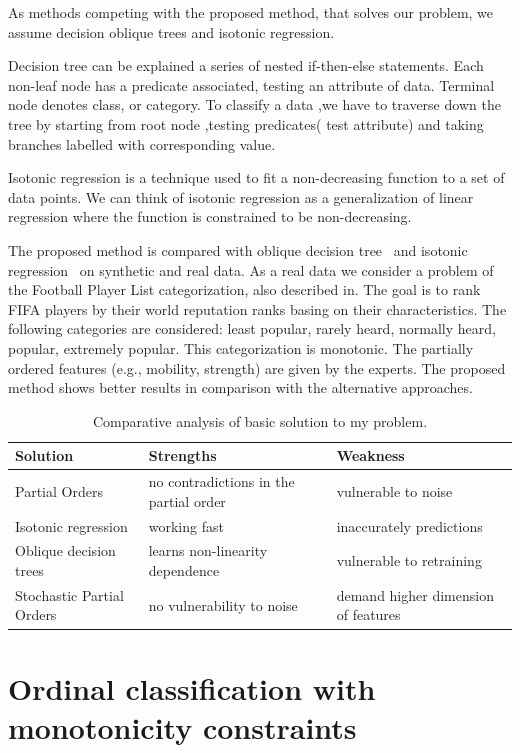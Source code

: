 \documentclass[12pt,preprint]{elsarticle}
\begin{document}
As methods competing with the proposed method, that solves our problem, we assume decision oblique trees and isotonic regression.

Decision tree can be explained a series of nested if-then-else statements. Each  non-leaf  node  has  a  predicate  associated, testing an  attribute of data.  Terminal node  denotes class, or category. To classify a data ,we have to traverse down the tree by starting  from root  node ,testing predicates( test attribute) and taking branches labelled with corresponding value.

Isotonic regression is a technique used to fit a non-decreasing function to a set of data points.
We can think of isotonic regression as a generalization of linear regression where the function is constrained to be non-decreasing.

The proposed method is compared with oblique decision tree~\cite{Wilhelm2021} and isotonic regression~\cite{SALMON2017} on synthetic and real data. As a real data we consider a problem of the Football Player List categorization, also described in. The goal is to rank FIFA players by their world reputation ranks basing on their characteristics. The following categories are considered: least popular, rarely heard, normally heard, popular, extremely popular. This categorization is monotonic. The partially ordered features (e.g., mobility, strength) are given by the experts. The proposed method shows better results in comparison with the alternative approaches.

\begin{table}[!htbp]
\label{tab:intro_comparative}
\caption{Comparative analysis of basic solution to my problem.}
\begin{tabular}{p{5cm}|p{5cm}|p{5cm}}
	Solution & Strengths & Weakness \\
	\hline
	Partial Orders & 
	no contradictions in the partial order &
	vulnerable to noise \\
    \hline
	Isotonic regression & 
	working fast &
	inaccurately predictions \\
    \hline
	Oblique decision trees & 
	learns non-linearity dependence &
	vulnerable to retraining \\
    \hline
	Stochastic Partial Orders & 
	no vulnerability to noise &
	demand higher dimension of features \\
\end{tabular} 
\end{table}

\section{Ordinal classification with monotonicity constraints}
\end{document}
